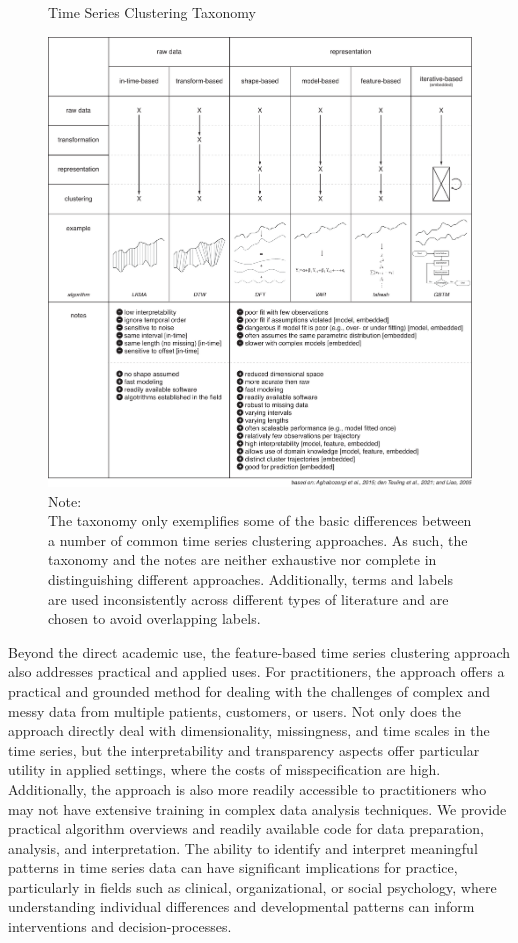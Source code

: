 \documentclass[man, 12pt, a4paper, mask, floatsintext]{apa7}
\theoremstyle{break}
\theoremstyle{plain}
\begin{document}
\begin{figure}[!hbtp] %
  \caption{Time Series Clustering Taxonomy}
  \label{fig:tsClustTax}
  \centering\includegraphics[width=\textwidth]{figures/TS Cluster Flow/tsClustTax.pdf}
  \caption*{Note: \\
  The taxonomy only exemplifies some of the basic differences between a number of common time series clustering approaches. As such, the taxonomy and the notes are neither exhaustive nor complete in distinguishing different approaches. Additionally, terms and labels are used inconsistently across different types of literature and are chosen to avoid overlapping labels.}
\end{figure}

Beyond the direct academic use, the feature-based time series clustering approach also addresses practical and applied uses. For practitioners, the approach offers a practical and grounded method for dealing with the challenges of complex and messy data from multiple patients, customers, or users. Not only does the approach directly deal with dimensionality, missingness, and time scales in the time series, but the interpretability and transparency aspects offer particular utility in applied settings, where the costs of misspecification are high. Additionally, the approach is also more readily accessible to practitioners who may not have extensive training in complex data analysis techniques. We provide practical algorithm overviews and readily available code for data preparation, analysis, and interpretation. The ability to identify and interpret meaningful patterns in time series data can have significant implications for practice, particularly in fields such as clinical, organizational, or social psychology, where understanding individual differences and developmental patterns can inform interventions and decision-processes.
\end{document}
